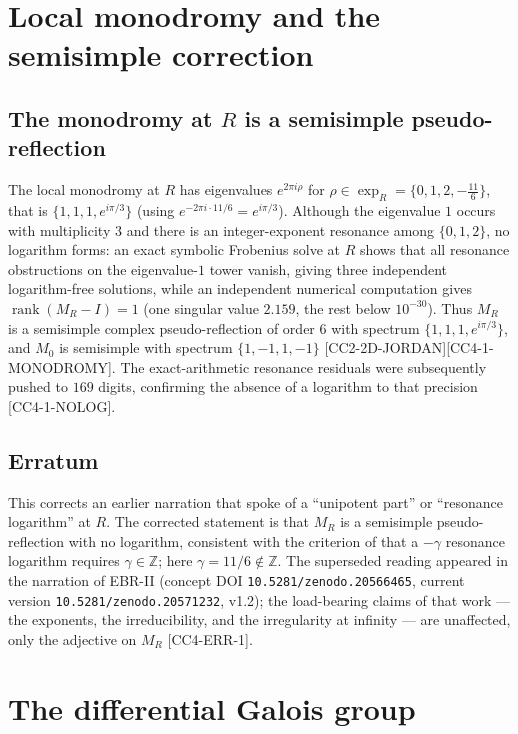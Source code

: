 \documentclass[11pt,reqno]{amsart}
\theoremstyle{plain}
\theoremstyle{definition}
\theoremstyle{remark}
\newcommand{\Z}{\mathbb{Z}}
\newcommand{\claim}[1]{\textsf{\small[#1]}}
\begin{document}
\section{Local monodromy and the semisimple correction}\label{sec:local}

\subsection{The monodromy at $R$ is a semisimple pseudo-reflection}
The local monodromy at $R$ has eigenvalues $e^{2\pi i\rho}$ for
$\rho\in\exp_{R}=\{0,1,2,-\tfrac{11}{6}\}$, that is $\{1,1,1,e^{i\pi/3}\}$
(using $e^{-2\pi i\cdot11/6}=e^{i\pi/3}$). Although the eigenvalue $1$ occurs
with multiplicity $3$ and there is an integer-exponent resonance among
$\{0,1,2\}$, no logarithm forms: an exact symbolic Frobenius solve at $R$ shows
that all resonance obstructions on the eigenvalue-$1$ tower vanish, giving
three independent logarithm-free solutions, while an independent numerical
computation gives $\operatorname{rank}(M_{R}-I)=1$ (one singular value
$2.159$, the rest below $10^{-30}$). Thus $M_{R}$ is a semisimple complex
pseudo-reflection of order $6$ with spectrum $\{1,1,1,e^{i\pi/3}\}$, and
$M_{0}$ is semisimple with spectrum $\{1,-1,1,-1\}$
\claim{CC2-2D-JORDAN}\claim{CC4-1-MONODROMY}. The exact-arithmetic resonance
residuals were subsequently pushed to $169$ digits, confirming the absence of
a logarithm to that precision \claim{CC4-1-NOLOG}.

\subsection{Erratum}\label{sec:erratum}
This corrects an earlier narration that spoke of a ``unipotent part'' or
``resonance logarithm'' at $R$. The corrected statement is that $M_{R}$ is a
semisimple pseudo-reflection with no logarithm, consistent with the criterion
of \cite{EBRII} that a $-\gamma$ resonance logarithm requires $\gamma\in\Z$;
here $\gamma=11/6\notin\Z$. The superseded reading appeared in the narration of
EBR-II (concept DOI \texttt{10.5281/zenodo.20566465}, current version
\texttt{10.5281/zenodo.20571232}, v1.2); the load-bearing claims of that work
--- the exponents, the irreducibility, and the irregularity at infinity --- are
unaffected, only the adjective on $M_{R}$ \claim{CC4-ERR-1}.

\section{The differential Galois group}\label{sec:main}
\end{document}
